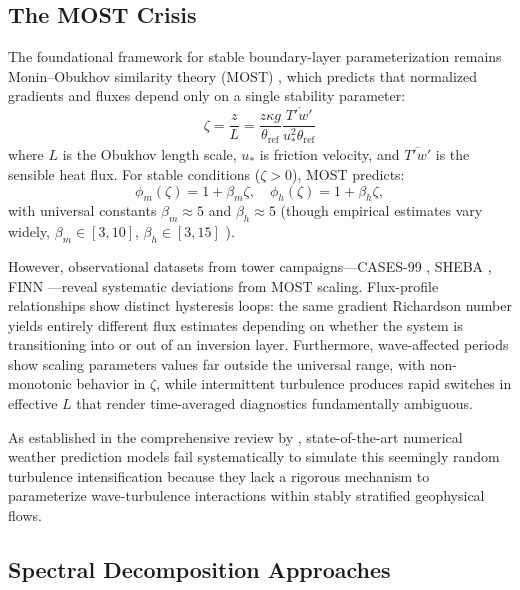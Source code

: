 \documentclass[11pt,a4paper]{article}
\begin{document}
\subsection{The MOST Crisis}

The foundational framework for stable boundary-layer parameterization remains Monin--Obukhov similarity theory (MOST) \citep{Obukhov1946, Paulson1970}, which predicts that normalized gradients and fluxes depend only on a single stability parameter:
\begin{equation}
\zeta = \frac{z}{L} = \frac{z \kappa g}{\theta_{\mathrm{ref}}} \frac{\overline{T'w'}}{u_*^2 \theta_{\mathrm{ref}}}
\label{eq:zeta}
\end{equation}
where $L$ is the Obukhov length scale, $u_*$ is friction velocity, and $\overline{T'w'}$ is the sensible heat flux. For stable conditions ($\zeta > 0$), MOST predicts:
\begin{equation}
\phi_m(\zeta) = 1 + \beta_m\zeta, \quad \phi_h(\zeta) = 1 + \beta_h\zeta,
\end{equation}
with universal constants $\beta_m \approx 5$ and $\beta_h \approx 5$ (though empirical estimates vary widely, $\beta_m \in [3, 10]$, $\beta_h \in [3, 15]$ \citep{Dyer1974, Högström1988}).

However, observational datasets from tower campaigns---CASES-99 \citep{Poulos2002}, SHEBA \citep{Uttal2002}, FINN \citep{Mahrt2013}---reveal systematic deviations from MOST scaling. Flux-profile relationships show distinct hysteresis loops: the same gradient Richardson number yields entirely different flux estimates depending on whether the system is transitioning into or out of an inversion layer. Furthermore, wave-affected periods show scaling parameters values far outside the universal range, with non-monotonic behavior in $\zeta$, while intermittent turbulence produces rapid switches in effective $L$ that render time-averaged diagnostics fundamentally ambiguous.

As established in the comprehensive review by \citet{Sun2015}, state-of-the-art numerical weather prediction models fail systematically to simulate this seemingly random turbulence intensification because they lack a rigorous mechanism to parameterize wave-turbulence interactions within stably stratified geophysical flows.

\subsection{Spectral Decomposition Approaches}
\end{document}
